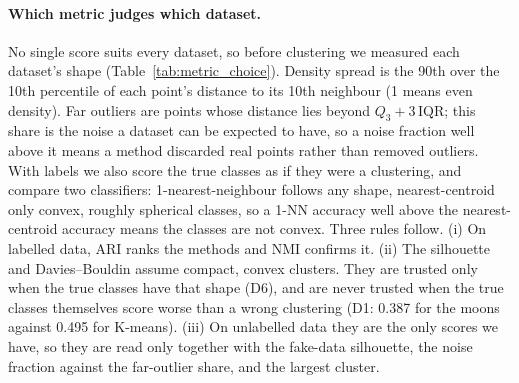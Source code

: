 \paragraph{Which metric judges which dataset.}
No single score suits every dataset, so before clustering we measured each dataset's shape
(Table~\ref{tab:metric_choice}). Density spread is the 90th over the 10th percentile of each point's distance
to its 10th neighbour (1 means even density). Far outliers are points whose distance lies beyond
$Q_3+3\,\mathrm{IQR}$; this share is the noise a dataset can be expected to have, so a noise fraction well
above it means a method discarded real points rather than removed outliers. With labels we also score the
true classes as if they were a clustering, and compare two classifiers: 1-nearest-neighbour follows any
shape, nearest-centroid only convex, roughly spherical classes, so a 1-NN accuracy well above the
nearest-centroid accuracy means the classes are not convex. Three rules follow. (i) On labelled data, ARI
ranks the methods and NMI confirms it. (ii) The silhouette and Davies--Bouldin assume compact, convex
clusters. They are trusted only when the true classes have that shape (D6), and are never trusted when the
true classes themselves score worse than a wrong clustering (D1: 0.387 for the moons against 0.495 for
K-means). (iii) On unlabelled data they are the only scores we have, so they are read only together with the
fake-data silhouette, the noise fraction against the far-outlier share, and the largest cluster.

